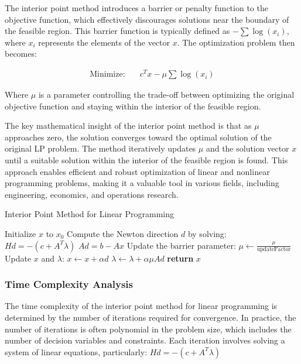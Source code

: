 The interior point method
introduces a barrier or penalty function to the objective function,
which effectively discourages solutions near the boundary of the feasible
region. This barrier function is typically defined as $-\sum \log(x_i)$,
where $x_i$ represents the elements of the vector $x$.
The optimization problem then becomes:

\[
    \begin{aligned}
        \text{Minimize:} \quad & c^Tx - \mu \sum \log(x_i)
    \end{aligned}
\]

Where $\mu$ is a parameter controlling the trade-off between
optimizing the original objective function and staying within
the interior of the feasible region.

The key mathematical insight of the interior point method is that
as $\mu$ approaches zero, the solution converges toward the optimal
solution of the original LP problem. The method iteratively updates $\mu$
and the solution vector $x$ until a suitable solution within the interior
of the feasible region is found. This approach enables efficient and robust
optimization of linear and nonlinear programming problems, making it a
valuable tool in various fields, including engineering, economics, and
operations research.

\begin{algorithm}[H]
    \caption{Interior Point Method for Linear Programming}
    \begin{algorithmic}[1]
        \State Initialize $x$ to $x_0$
        \State Compute the Newton direction $d$ by solving:
        \State \quad $Hd = -(c + A^T\lambda)$
        \State \quad $Ad = b - Ax$
        \State Update the barrier parameter:
        \State \quad $\mu \leftarrow \frac{\mu}{\text{updateFactor}}$
        \State Update $x$ and $\lambda$:
        \State \quad $x \leftarrow x + \alpha d$
        \State \quad $\lambda \leftarrow \lambda + \alpha \mu Ad$
        \EndWhile
        \State \textbf{return} $x$ 
        \EndProcedure
    \end{algorithmic}
\end{algorithm}

\subsubsection{Time Complexity Analysis}
The time complexity of the interior
point method for linear programming is determined by
the number of iterations required for convergence.
In practice, the number of iterations is often polynomial in
the problem size, which includes the number of decision variables and
constraints.
Each iteration involves solving a system of linear equations,
particularly: $Hd = -(c + A^T\lambda)$

